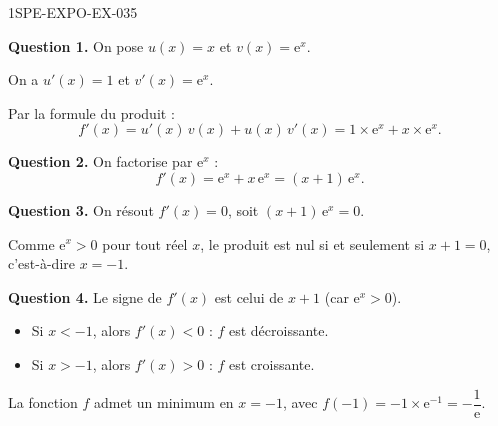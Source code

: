 \begin{corrige}{1SPE-EXPO-EX-035}

\textbf{Question 1.} On pose $u(x) = x$ et $v(x) = \mathrm{e}^{x}$.

On a $u'(x) = 1$ et $v'(x) = \mathrm{e}^{x}$.

Par la formule du produit :
\[f'(x) = u'(x)\,v(x) + u(x)\,v'(x) = 1 \times \mathrm{e}^{x} + x \times \mathrm{e}^{x}.\]

\textbf{Question 2.} On factorise par $\mathrm{e}^{x}$ :
\[f'(x) = \mathrm{e}^{x} + x\,\mathrm{e}^{x} = \boxed{(x+1)\,\mathrm{e}^{x}}.\]

\textbf{Question 3.} On résout $f'(x) = 0$, soit $(x+1)\,\mathrm{e}^{x} = 0$.

Comme $\mathrm{e}^{x} > 0$ pour tout réel $x$, le produit est nul si et seulement si $x + 1 = 0$, c'est-à-dire $\boxed{x = -1}$.

\textbf{Question 4.} Le signe de $f'(x)$ est celui de $x + 1$ (car $\mathrm{e}^{x} > 0$).
\begin{itemize}
\item Si $x < -1$, alors $f'(x) < 0$ : $f$ est décroissante.
\item Si $x > -1$, alors $f'(x) > 0$ : $f$ est croissante.
\end{itemize}
La fonction $f$ admet un minimum en $x = -1$, avec $f(-1) = -1 \times \mathrm{e}^{-1} = -\dfrac{1}{\mathrm{e}}$.
\end{corrige}
